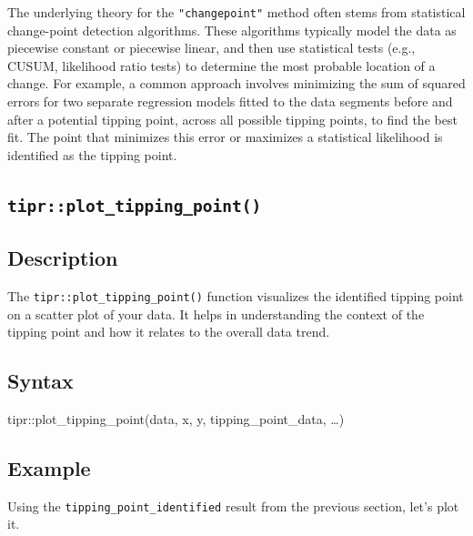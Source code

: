 \documentclass[
  10pt,
  letterpaper,
  DIV=11,
  numbers=noendperiod]{scrartcl}
\newenvironment{Shaded}{\begin{snugshade}}{\end{snugshade}}
\newcommand{\FunctionTok}[1]{\textcolor[rgb]{0.28,0.35,0.67}{#1}}
\newcommand{\NormalTok}[1]{\textcolor[rgb]{0.00,0.23,0.31}{#1}}
\newcommand{\SpecialCharTok}[1]{\textcolor[rgb]{0.37,0.37,0.37}{#1}}
\begin{document}
The underlying theory for the \texttt{"changepoint"} method often stems
from statistical change-point detection algorithms. These algorithms
typically model the data as piecewise constant or piecewise linear, and
then use statistical tests (e.g., CUSUM, likelihood ratio tests) to
determine the most probable location of a change. For example, a common
approach involves minimizing the sum of squared errors for two separate
regression models fitted to the data segments before and after a
potential tipping point, across all possible tipping points, to find the
best fit. The point that minimizes this error or maximizes a statistical
likelihood is identified as the tipping point.

\subsection{\texorpdfstring{\texttt{tipr::plot\_tipping\_point()}}{tipr::plot\_tipping\_point()}}\label{tiprplot_tipping_point}

\subsection{Description}\label{description-1}

The \texttt{tipr::plot\_tipping\_point()} function visualizes the
identified tipping point on a scatter plot of your data. It helps in
understanding the context of the tipping point and how it relates to the
overall data trend.

\subsection{Syntax}\label{syntax-1}

\begin{Shaded}
\begin{Highlighting}[]
\NormalTok{tipr}\SpecialCharTok{::}\FunctionTok{plot\_tipping\_point}\NormalTok{(data, x, y, tipping\_point\_data, …)}
\end{Highlighting}
\end{Shaded}

\subsection{Example}\label{example-1}

Using the \texttt{tipping\_point\_identified} result from the previous
section, let's plot it.
\end{document}
